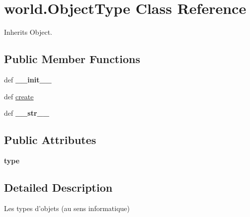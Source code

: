 \hypertarget{classworld_1_1_object_type}{\section{world.\-Object\-Type \-Class \-Reference}
\label{classworld_1_1_object_type}
}


\-Inherits \-Object.

\subsection*{\-Public \-Member \-Functions}
\begin{DoxyCompactItemize}
\item 
\hypertarget{classworld_1_1_object_type_a8e22b69e8867f70d768f1c29b5d67299}{def {\bfseries \-\_\-\-\_\-init\-\_\-\-\_\-}}\label{classworld_1_1_object_type_a8e22b69e8867f70d768f1c29b5d67299}

\item 
def \hyperlink{classworld_1_1_object_type_aec3659e529c2f58cc8ec05a759811015}{create}
\item 
\hypertarget{classworld_1_1_object_type_a338113a75208a1dd1ff1e3a60fcc2dbb}{def {\bfseries \-\_\-\-\_\-str\-\_\-\-\_\-}}\label{classworld_1_1_object_type_a338113a75208a1dd1ff1e3a60fcc2dbb}

\end{DoxyCompactItemize}
\subsection*{\-Public \-Attributes}
\begin{DoxyCompactItemize}
\item 
\hypertarget{classworld_1_1_object_type_ae9880fda72c8950d1b1b070efa72279e}{{\bfseries type}}\label{classworld_1_1_object_type_ae9880fda72c8950d1b1b070efa72279e}

\end{DoxyCompactItemize}


\subsection{\-Detailed \-Description}
\begin{DoxyVerb}Les types d'objets (au sens informatique) \end{DoxyVerb}
 

